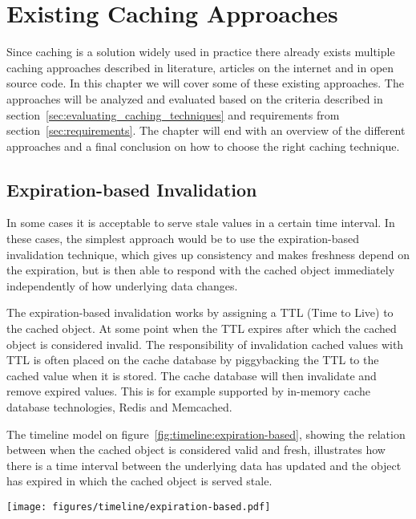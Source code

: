 \chapter{Existing Caching Approaches}
\label{chapter:caching}

Since caching is a solution widely used in practice there already exists multiple caching approaches described in literature, articles on the internet and in open source code. In this chapter we will cover some of these existing approaches. The approaches will be analyzed and evaluated based on the criteria described in section~\ref{sec:evaluating_caching_techniques} and requirements from section~\ref{sec:requirements}. The chapter will end with an overview of the different approaches and a final conclusion on how to choose the right caching technique.

\section{Expiration-based Invalidation}
\label{subsec:expiration_based_invalidation}

In some cases it is acceptable to serve stale values in a certain time interval. In these cases, the simplest approach would be to use the expiration-based invalidation technique, which gives up consistency and makes freshness depend on the expiration, but is then able to respond with the cached object immediately independently of how underlying data changes.

The expiration-based invalidation works by assigning a TTL (Time to Live) to the cached object. At some point when the TTL expires after which the cached object is considered invalid. The responsibility of invalidation cached values with TTL is often placed on the cache database by piggybacking the TTL to the cached value when it is stored. The cache database will then invalidate and remove expired values. This is for example supported by in-memory cache database technologies, Redis and Memcached.

The timeline model on figure~\ref{fig:timeline:expiration-based}, showing the relation between when the cached object is considered valid and fresh, illustrates how there is a time interval between the underlying data has updated and the object has expired in which the cached object is served stale.

\begin{figure*}[ht!]
  \centering
  \texttt{[image: figures/timeline/expiration-based.pdf]}
  \caption{The lifecycle of the expiration-based invalidation technique}
  \label{fig:timeline:expiration-based}
\end{figure*}

